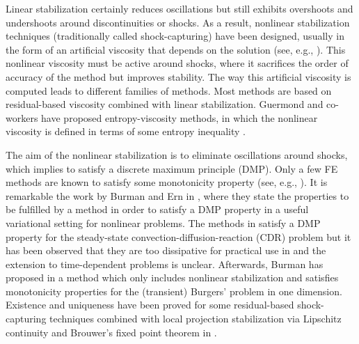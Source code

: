 

Linear stabilization certainly reduces oscillations but still exhibits overshoots and undershoots around discontinuities or shocks. As a result, nonlinear stabilization techniques (traditionally called shock-capturing) have been designed, usually in the form of an artificial viscosity that depends on the solution (see, e.g., \cite{johnson_convergence_1987,johnson_convergence_1990,szepessy_convergence_1989}). This nonlinear viscosity must be active around shocks, where it sacrifices the order of accuracy of the method but improves stability. The way this artificial viscosity is computed leads to different families of methods. Most methods are based on residual-based viscosity \cite{codina_stabilization_2000,lube_residual-based_2006,john_spurious_2007,john_spurious_2008} combined with linear stabilization. Guermond and co-workers have proposed entropy-viscosity methods, %
 in which the nonlinear viscosity is defined in terms of some entropy inequality \cite{guermond_entropy_2011}. %

The aim of the nonlinear stabilization is to eliminate oscillations around shocks, which implies to satisfy a discrete maximum principle (DMP). Only a few FE methods are known to satisfy some monotonicity property (see, e.g., \cite{mizukami_petrov-galerkin_1985,burman_nonlinear_2002,burman_stabilized_2005}). It is remarkable the work by Burman and Ern in \cite{burman_nonlinear_2002}, where they state the properties to be fulfilled by a method in order to satisfy a DMP property in a useful variational setting for nonlinear problems. The methods in \cite{burman_stabilized_2005,burman_edge_2004} satisfy a DMP property for the steady-state convection-diffusion-reaction (CDR) problem but it has been observed that they are too dissipative for practical use in \cite{john_spurious_2008} and the extension to time-dependent problems is unclear. Afterwards, Burman has proposed in \cite{burman_nonlinear_2007} a method which only includes nonlinear stabilization and satisfies monotonicity properties for the (transient) Burgers' problem in one dimension. %
Existence and uniqueness have been proved for some residual-based shock-capturing techniques combined with local
projection stabilization via Lipschitz continuity and Brouwer's fixed point theorem in \cite{barrenechea_local_2013}.

